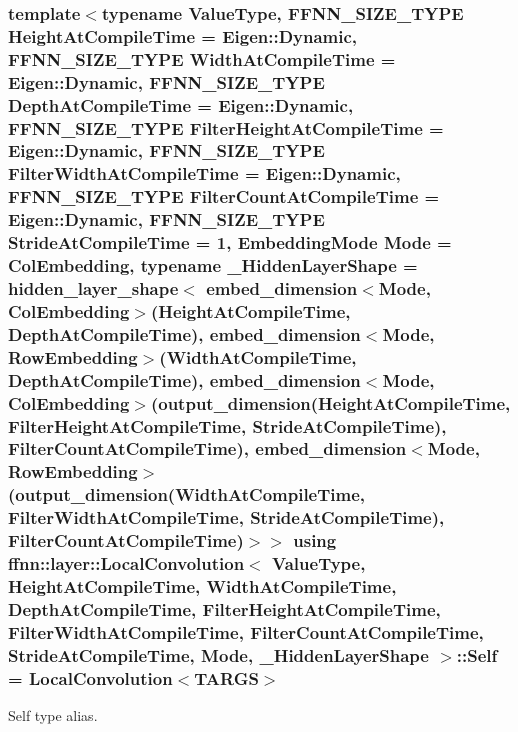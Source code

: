 \hypertarget{classffnn_1_1layer_1_1_local_convolution_aeac716acfc0babed958f927490d17992}{
\subsubsection[{Self}]{\setlength{\rightskip}{0pt plus 5cm}template$<$typename Value\-Type, F\-F\-N\-N\-\_\-\-S\-I\-Z\-E\-\_\-\-T\-Y\-P\-E Height\-At\-Compile\-Time = Eigen\-::\-Dynamic, F\-F\-N\-N\-\_\-\-S\-I\-Z\-E\-\_\-\-T\-Y\-P\-E Width\-At\-Compile\-Time = Eigen\-::\-Dynamic, F\-F\-N\-N\-\_\-\-S\-I\-Z\-E\-\_\-\-T\-Y\-P\-E Depth\-At\-Compile\-Time = Eigen\-::\-Dynamic, F\-F\-N\-N\-\_\-\-S\-I\-Z\-E\-\_\-\-T\-Y\-P\-E Filter\-Height\-At\-Compile\-Time = Eigen\-::\-Dynamic, F\-F\-N\-N\-\_\-\-S\-I\-Z\-E\-\_\-\-T\-Y\-P\-E Filter\-Width\-At\-Compile\-Time = Eigen\-::\-Dynamic, F\-F\-N\-N\-\_\-\-S\-I\-Z\-E\-\_\-\-T\-Y\-P\-E Filter\-Count\-At\-Compile\-Time = Eigen\-::\-Dynamic, F\-F\-N\-N\-\_\-\-S\-I\-Z\-E\-\_\-\-T\-Y\-P\-E Stride\-At\-Compile\-Time = 1, Embedding\-Mode Mode = Col\-Embedding, typename \-\_\-\-Hidden\-Layer\-Shape = hidden\-\_\-layer\-\_\-shape$<$              embed\-\_\-dimension$<$\-Mode, Col\-Embedding$>$(\-Height\-At\-Compile\-Time, Depth\-At\-Compile\-Time),              embed\-\_\-dimension$<$\-Mode, Row\-Embedding$>$(\-Width\-At\-Compile\-Time,  Depth\-At\-Compile\-Time),              embed\-\_\-dimension$<$\-Mode, Col\-Embedding$>$(output\-\_\-dimension(\-Height\-At\-Compile\-Time, Filter\-Height\-At\-Compile\-Time, Stride\-At\-Compile\-Time), Filter\-Count\-At\-Compile\-Time),              embed\-\_\-dimension$<$\-Mode, Row\-Embedding$>$(output\-\_\-dimension(\-Width\-At\-Compile\-Time,  Filter\-Width\-At\-Compile\-Time,  Stride\-At\-Compile\-Time), Filter\-Count\-At\-Compile\-Time)$>$$>$ using {\bf ffnn\-::layer\-::\-Local\-Convolution}$<$ Value\-Type, Height\-At\-Compile\-Time, Width\-At\-Compile\-Time, Depth\-At\-Compile\-Time, Filter\-Height\-At\-Compile\-Time, Filter\-Width\-At\-Compile\-Time, Filter\-Count\-At\-Compile\-Time, Stride\-At\-Compile\-Time, Mode, \-\_\-\-Hidden\-Layer\-Shape $>$\-::{\bf Self} =  {\bf Local\-Convolution}$<${\bf T\-A\-R\-G\-S}$>$}}\label{classffnn_1_1layer_1_1_local_convolution_aeac716acfc0babed958f927490d17992}


Self type alias. 

